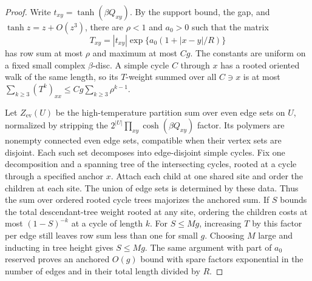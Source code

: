 \documentclass[11pt]{article}
\theoremstyle{definition}
\begin{document}
\begin{proof}
Write \(t_{xy}=\tanh(\beta Q_{xy})\). By the support bound, the
gap, and \(\tanh z=z+O(z^3)\), there are \(\rho<1\) and \(a_0>0\)
such that the matrix
\begin{equation}
 T_{xy}=|t_{xy}|\exp\{a_0(1+|x-y|/R)\}
\end{equation}
has row sum at most \(\rho\) and maximum at most \(Cg\).
The constants are uniform on a fixed small complex \(\beta\)-disc.
A simple cycle \(C\) through \(x\) has a rooted oriented walk of
the same length, so its \(T\)-weight summed over all \(C\ni x\)
is at most \(\sum_{k\ge3}(T^k)_{xx}\le
Cg\sum_{k\ge3}\rho^{k-1}\).

Let \(Z_{\mathrm{ev}}(U)\) be the high-temperature partition sum
over even edge sets on \(U\), normalized by stripping the
\(2^{|U|}\prod_{xy}\cosh(\beta Q_{xy})\) factor. Its polymers are
nonempty connected even edge sets, compatible when their vertex
sets are disjoint. Each such set decomposes into edge-disjoint
simple cycles. Fix one decomposition and a spanning tree of the
intersecting cycles, rooted at a cycle through a specified anchor
\(x\). Attach each child at one shared site and order the children
at each site. The union of edge sets is determined by these
data. Thus the sum over ordered rooted cycle trees majorizes
the anchored sum. If \(S\) bounds the total descendant-tree
weight rooted at any site, ordering the children costs at most
\((1-S)^{-k}\) at a cycle of length \(k\). For \(S\le M g\),
increasing \(T\) by this factor per edge still leaves row sum
less than one for small \(g\). Choosing \(M\) large and
inducting in tree height gives \(S\le M g\).
The same argument with part of \(a_0\) reserved proves an
anchored \(O(g)\) bound with spare factors exponential in the
number of edges and in their total length divided by \(R\).


\end{proof}
\end{document}
